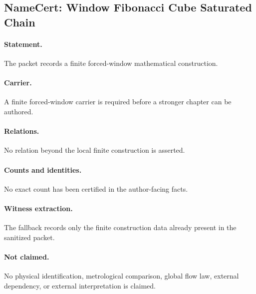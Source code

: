 \subsection{NameCert: Window Fibonacci Cube Saturated Chain}
\label{sec:namecert-window_fibonacci_cube_saturated_chain_certificate}

\paragraph{Statement.} The packet records a finite forced-window mathematical construction.

\paragraph{Carrier.} A finite forced-window carrier is required before a stronger chapter can be authored.

\paragraph{Relations.} No relation beyond the local finite construction is asserted.

\paragraph{Counts and identities.} No exact count has been certified in the author-facing facts.

\paragraph{Witness extraction.} The fallback records only the finite construction data already present in the sanitized packet.

\paragraph{Not claimed.} No physical identification, metrological comparison, global flow law, external dependency, or external interpretation is claimed.
